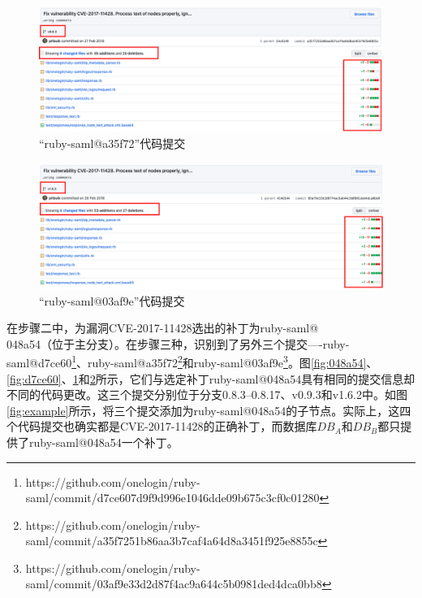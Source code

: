 \begin{figure}[!t]
    \centering
    \includegraphics[scale=0.30]{fig/11428-commit-a35f72}
    \caption{“ruby-saml@a35f72”代码提交}\label{fig:a35f72}
\end{figure}

\begin{figure}[!t]
    \centering
    \includegraphics[scale=0.30]{fig/11428-commit-03af9e}
    \caption{“ruby-saml@03af9e”代码提交}\label{fig:03af9e}
\end{figure}

\begin{exmp}
在步骤二中，\tool 为漏洞CVE-2017-11428选出的补丁为ruby-saml@\\048a54（位于主分支）。在步骤三种，\tool 识别到了另外三个提交----ruby-saml@d7ce60\footnote{https://github.com/onelogin/ruby-saml/commit/d7ce607d9f9d996e1046dde09b675c3cf0c01280}、ruby-saml@a35f72\footnote{https://github.com/onelogin/ruby-saml/commit/a35f7251b86aa3b7caf4a64d8a3451f925e8855c}和ruby-saml@03af9e\footnote{https://github.com/onelogin/ruby-saml/commit/03af9e33d2d87f4ac9a644c5b0981ded4dca0bb8}。图\ref{fig:048a54}、\ref{fig:d7ce60}、\ref{fig:a35f72}和\ref{fig:03af9e}所示，它们与选定补丁ruby-saml@048a54具有相同的提交信息却不同的代码更改。这三个提交分别位于分支0.8.3--0.8.17、v0.9.3和v1.6.2中。如图\ref{fig:example}所示，\tool 将三个提交添加为ruby-saml@048a54的子节点。实际上，这四个代码提交也确实都是CVE-2017-11428的正确补丁，而数据库$DB_A$和$DB_B$都只提供了ruby-saml@048a54一个补丁。
\end{exmp}

